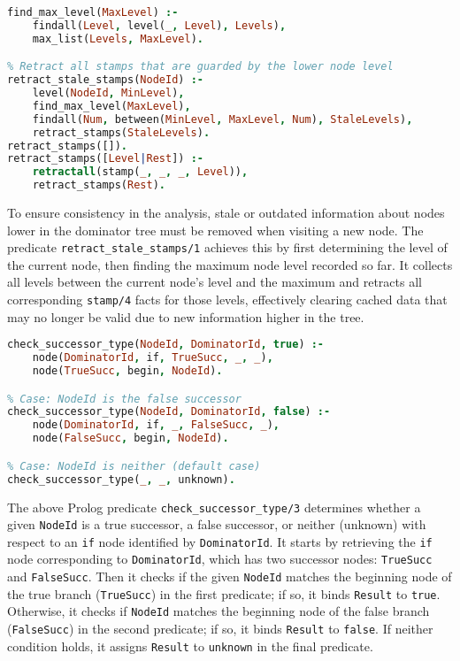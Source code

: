 \begin{lstlisting}[language=Prolog]
% Predicate to find the maximum levels of the tree
find_max_level(MaxLevel) :-
    findall(Level, level(_, Level), Levels),
    max_list(Levels, MaxLevel).

% Retract all stamps that are guarded by the lower node level
retract_stale_stamps(NodeId) :-
    level(NodeId, MinLevel),
    find_max_level(MaxLevel),
    findall(Num, between(MinLevel, MaxLevel, Num), StaleLevels),
    retract_stamps(StaleLevels).
retract_stamps([]).
retract_stamps([Level|Rest]) :-
    retractall(stamp(_, _, _, Level)),
    retract_stamps(Rest).
\end{lstlisting}


To ensure consistency in the analysis, stale or outdated information about nodes lower in the dominator tree must be removed when visiting a new node. The predicate \texttt{retract\_stale\_stamps/1} achieves this by first determining the level of the current node, then finding the maximum node level recorded so far. It collects all levels between the current node’s level and the maximum and retracts all corresponding \texttt{stamp/4} facts for those levels, effectively clearing cached data that may no longer be valid due to new information higher in the tree.

\newpage

\begin{lstlisting}[language=Prolog]
% Case: NodeId is the true successor
check_successor_type(NodeId, DominatorId, true) :-
    node(DominatorId, if, TrueSucc, _, _),
    node(TrueSucc, begin, NodeId).

% Case: NodeId is the false successor
check_successor_type(NodeId, DominatorId, false) :-
    node(DominatorId, if, _, FalseSucc, _),
    node(FalseSucc, begin, NodeId).

% Case: NodeId is neither (default case)
check_successor_type(_, _, unknown).
\end{lstlisting}

The above Prolog predicate \texttt{check\_successor\_type/3} determines whether a given \texttt{NodeId} is a true successor, a false successor, or neither (unknown) with respect to an \texttt{if} node identified by \texttt{DominatorId}. It starts by retrieving the \texttt{if} node corresponding to \texttt{DominatorId}, which has two successor nodes: \texttt{TrueSucc} and \texttt{FalseSucc}. Then it checks if the given \texttt{NodeId} matches the beginning node of the true branch (\texttt{TrueSucc}) in the first predicate; if so, it binds \texttt{Result} to \texttt{true}. Otherwise, it checks if \texttt{NodeId} matches the beginning node of the false branch (\texttt{FalseSucc}) in the second predicate; if so, it binds \texttt{Result} to \texttt{false}. If neither condition holds, it assigns \texttt{Result} to \texttt{unknown} in the final predicate.

